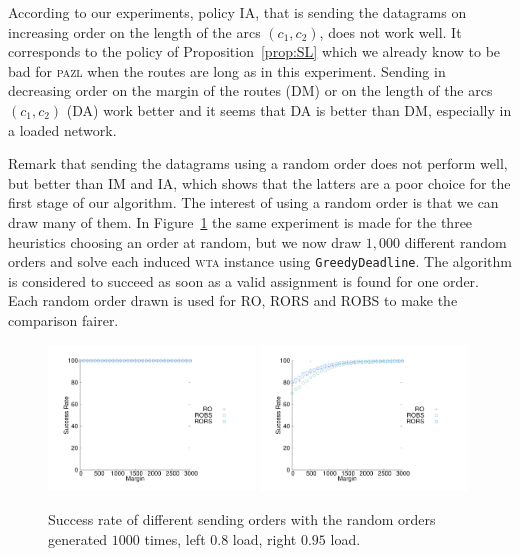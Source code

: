 \documentclass[a4paper,10pt]{journal}
\newcommand\greedydeadline{\texttt{GreedyDeadline}\xspace}
\newcommand\pazl{\textsc{pazl}\xspace}
\newcommand\wta{\textsc{wta}\xspace}
\begin{document}
          
     According to our experiments, policy IA, that is sending the datagrams on increasing order on the length of the arcs $(c_1,c_2)$, does not work well. It corresponds to the policy of Proposition~\ref{prop:SL} which we already know to be bad for \pazl when the routes are long as in this experiment. Sending in decreasing order on the margin of the routes (DM) or on the length of the arcs $(c_1,c_2)$ (DA) work better and it seems that DA is better than DM, especially in a loaded network. 
     
     Remark that sending the datagrams using a random order does not perform well,
     but better than IM and IA, which shows that the latters are a poor choice for the first stage of our algorithm. The interest of using a random order is that we can draw many of them. In Figure~\ref{fig:success1000random} the same experiment is made for the three heuristics choosing an order at random, but we now draw $1,000$ different random orders and solve each induced \wta instance using \greedydeadline. The algorithm is considered to succeed as soon as a valid assignment is found for one order. Each random order drawn is used for RO, RORS and ROBS to make the comparison fairer.

\begin{figure}[h] 
  \centering
  \includegraphics[width=0.49\textwidth]{departs_gp_25000.pdf}
    \includegraphics[width=0.49\textwidth]{departs_gp_21000.pdf}
    
       \caption{Success rate of different sending orders with the random orders generated $1000$ times, left $0.8$ load, right $0.95$ load.}
      \label{fig:success1000random}
          \end{figure}
\end{document}
